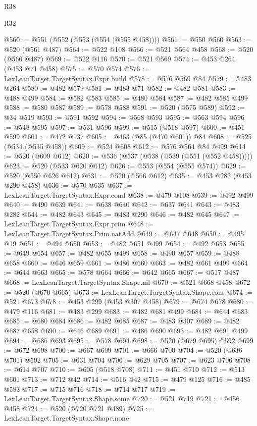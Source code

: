 \begin{lexlean}{R38}
\begin{lexlean}{R32}
\begin{coremodule}
{{{{{{{{{{{{{{{{{{{{{{{{{{{{{{{{{{{{{{{{{{{{{{{{{{{@560 := @551 (@552 (@553 (@554 (@555 @458))))
@561 := @550 @560
@563 := @520 (@561 @487)
@564 := @522 @108
@566 := @521 @564 @458
@568 := @520 (@566 @487)
@569 := @522 @116
@570 := @521 @569
@574 := @453 @264 (@453 @71 @458)
@575 := @570 @574
@576 := LexLeanTarget.TargetSyntax.Expr.build
@578 := @576 @569 @84
@579 := @483 @264
@580 := @482 @579
@581 := @483 @71
@582 := @482 @581
@583 := @488 @499
@584 := @582 @583
@585 := @480 @584
@587 := @482 @585 @499
@588 := @580 @587
@589 := @578 @588
@591 := @520 (@575 @589)
@592 := @34 @519
@593 := @591 @592
@594 := @568 @593
@595 := @563 @594
@596 := @548 @595
@597 := @531 @596
@599 := @515 (@518 @597)
@600 := @451 @599
@601 := @472 @137
@605 := @463 (@85 (@470 @601)) @84
@608 := @525 (@534 (@535 @458))
@609 := @524 @608
@612 := @576 @564 @84 @499
@614 := @520 (@609 @612)
@620 := @536 (@537 (@538 (@539 (@551 (@552 @458)))))
@623 := @520 (@533 @620 @612)
@626 := @553 (@554 (@555 @574))
@629 := @520 (@550 @626 @612)
@631 := @520 (@566 @612)
@635 := @453 @282 (@453 @290 @458)
@636 := @570 @635
@637 := LexLeanTarget.TargetSyntax.Expr.cond
@638 := @479 @108
@639 := @492 @499
@640 := @490 @639
@641 := @638 @640
@642 := @637 @641
@643 := @483 @282
@644 := @482 @643
@645 := @483 @290
@646 := @482 @645
@647 := LexLeanTarget.TargetSyntax.Expr.prim
@648 := LexLeanTarget.TargetSyntax.Prim.natAdd
@649 := @647 @648
@650 := @495 @19
@651 := @494 @650
@653 := @482 @651 @499
@654 := @492 @653
@655 := @649 @654
@657 := @482 @655 @499
@658 := @490 @657
@659 := @488 @658
@660 := @646 @659
@661 := @486 @660
@663 := @482 @661 @499
@664 := @644 @663
@665 := @578 @664
@666 := @642 @665
@667 := @517 @487
@668 := LexLeanTarget.TargetSyntax.Shape.nil
@670 := @521 @668 @458
@672 := @520 (@670 @665)
@673 := LexLeanTarget.TargetSyntax.Shape.cons
@674 := @521 @673
@678 := @453 @299 (@453 @307 @458)
@679 := @674 @678
@680 := @479 @116
@681 := @483 @299
@683 := @482 @681 @499
@684 := @644 @683
@685 := @680 @684
@686 := @482 @685
@687 := @483 @307
@689 := @482 @687 @658
@690 := @646 @689
@691 := @486 @690
@693 := @482 @691 @499
@694 := @686 @693
@695 := @578 @694
@698 := @520 (@679 @695) @592
@699 := @672 @698
@700 := @667 @699
@701 := @666 @700
@704 := @520 (@636 @701) @592
@705 := @631 @704
@706 := @629 @705
@707 := @623 @706
@708 := @614 @707
@710 := @605 (@518 @708)
@711 := @451 @710
@712 := @513 @601
@713 := @712 @42
@714 := @516 @42
@715 := @479 @125
@716 := @485 @583
@717 := @715 @716
@718 := @714 @717
@719 := LexLeanTarget.TargetSyntax.Shape.some
@720 := @521 @719
@721 := @456 @458
@724 := @520 (@720 @721 @489)
@725 := LexLeanTarget.TargetSyntax.Shape.none
}}}}}}}}}}}}}}}}}}}}}}}}}}}}}}}}}}}}}}}}}}}}}}}}}}}
\end{coremodule}
\end{lexlean}
\end{lexlean}
